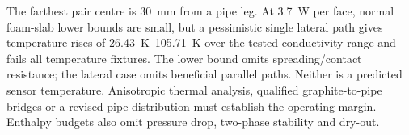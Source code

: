The farthest pair centre is \qty{30}{\milli\metre} from a pipe leg.
At \qty{3.7}{\watt} per face, normal foam-slab lower bounds are small, but a
pessimistic single lateral path gives temperature rises of
\qtyrange{26.43}{105.71}{\kelvin} over the tested conductivity range and fails
all temperature fixtures. The lower bound omits spreading/contact resistance;
the lateral case omits beneficial parallel paths. Neither is a predicted sensor
temperature. Anisotropic thermal analysis, qualified graphite-to-pipe bridges
or a revised pipe distribution must establish the operating margin. Enthalpy
budgets also omit pressure drop, two-phase stability and dry-out.